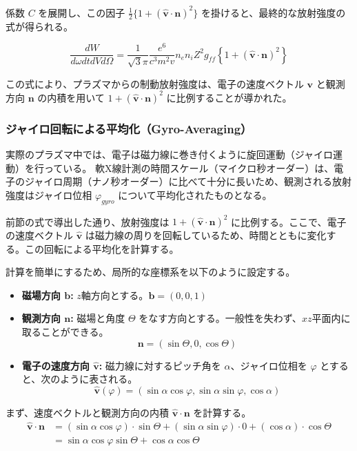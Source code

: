 \documentclass[a4paper,11pt]{bxjsarticle} %
\begin{document}
係数 $C$ を展開し、この因子 $\frac{1}{2} \{ 1 + (\hat{\bm{v}} \cdot \bm{n})^2 \}$ を掛けると、最終的な放射強度の式が得られる。

\begin{equation}
    \frac{d W}{d\omega dt dV d\Omega} = \frac{1}{\sqrt{3}\pi} \frac{e^6}{c^3 m^2 v} n_e n_i Z^2 g_{ff} \left\{ 1 + (\hat{\bm{v}} \cdot \bm{n})^2 \right\}
\end{equation}

この式により、プラズマからの制動放射強度は、電子の速度ベクトル $\bm{v}$ と観測方向 $\bm{n}$ の内積を用いて $1 + (\hat{\bm{v}} \cdot \bm{n})^2$ に比例することが導かれた。

\subsubsection{ジャイロ回転による平均化（Gyro-Averaging）}

実際のプラズマ中では、電子は磁力線に巻き付くように旋回運動（ジャイロ運動）を行っている。
軟X線計測の時間スケール（マイクロ秒オーダー）は、電子のジャイロ周期（ナノ秒オーダー）に比べて十分に長いため、観測される放射強度はジャイロ位相 $\varphi_{gyro}$ について平均化されたものとなる。

前節の式で導出した通り、放射強度は $1 + (\hat{\bm{v}} \cdot \bm{n})^2$ に比例する。ここで、電子の速度ベクトル $\hat{\bm{v}}$ は磁力線の周りを回転しているため、時間とともに変化する。この回転による平均化を計算する。

計算を簡単にするため、局所的な座標系を以下のように設定する。
\begin{itemize}
    \item \textbf{磁場方向 $\bm{b}$:} $z$軸方向とする。$\bm{b} = (0, 0, 1)$
    \item \textbf{観測方向 $\bm{n}$:} 磁場と角度 $\Theta$ をなす方向とする。一般性を失わず、$xz$平面内に取ることができる。
    \begin{equation}
        \bm{n} = (\sin\Theta, 0, \cos\Theta)
    \end{equation}
    \item \textbf{電子の速度方向 $\hat{\bm{v}}$:} 磁力線に対するピッチ角を $\alpha$、ジャイロ位相を $\varphi$ とすると、次のように表される。
    \begin{equation}
        \hat{\bm{v}}(\varphi) = (\sin\alpha \cos\varphi, \sin\alpha \sin\varphi, \cos\alpha)
    \end{equation}
\end{itemize}

まず、速度ベクトルと観測方向の内積 $\hat{\bm{v}} \cdot \bm{n}$ を計算する。
\begin{align}
    \hat{\bm{v}} \cdot \bm{n} &= (\sin\alpha \cos\varphi) \cdot \sin\Theta + (\sin\alpha \sin\varphi) \cdot 0 + (\cos\alpha) \cdot \cos\Theta \\
    &= \sin\alpha \cos\varphi \sin\Theta + \cos\alpha \cos\Theta
\end{align}
\end{document}
